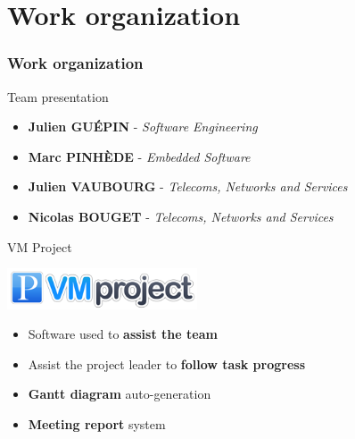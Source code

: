 \documentclass[12pt]{beamer}
\begin{document}
\part{Work organization}
\frame{\partpage}
\section{Work organization}

\begin{frame}{Team presentation}
    \begin{itemize}[<+->]
	\item {\bf Julien GUÉPIN} - \emph{Software Engineering}
	\vfill
	\item {\bf Marc PINHÈDE} - \emph{Embedded Software}
	\vfill
	\item {\bf Julien VAUBOURG} - \emph{Telecoms, Networks and Services}
	\vfill
	\item {\bf Nicolas BOUGET} - \emph{Telecoms, Networks and Services}
    \end{itemize}
\end{frame}

\begin{frame}{VM Project}
    \begin{center}
    \includegraphics[width=160pt]{img/vmproject_logo.png}
    \end{center}
    \begin{itemize}[<+->]
	\item Software used to \textbf{assist the team}
    	\vfill
    	\item Assist the project leader to \textbf{follow task progress}
    	\vfill
    	\item \textbf{Gantt diagram} auto-generation
    	\vfill
    	\item \textbf{Meeting report} system
    \end{itemize}
\end{frame}
\end{document}
